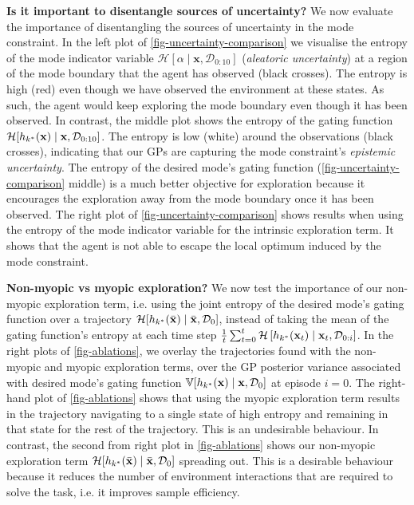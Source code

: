 \documentclass[twoside]{article}
\newcommand{\state}{\ensuremath{\mathbf{x}}}
\newcommand{\dataset}{\ensuremath{\mathcal{D}}}
\newcommand{\modeVar}{\ensuremath{\alpha}}
\newcommand{\gatingFunc}{\ensuremath{h}}
\begin{document}
\textbf{Is it important to disentangle sources of uncertainty?}
We now evaluate the importance of disentangling the sources of uncertainty in the mode constraint.
In the left plot of \cref{fig-uncertainty-comparison} we visualise the entropy of the mode indicator variable \(\mathcal{H}[\modeVar \mid \state, \dataset_{0:10}]\)
(\emph{aleatoric uncertainty}) at a region of the mode boundary that the agent has observed (black crosses).
The entropy is high (red) even though we have observed the environment at these states.
As such, the agent would keep exploring the mode boundary even though it has been observed.
In contrast,  the middle plot shows the entropy of the gating function \(\mathcal{H}[\gatingFunc_{\desiredMode}(\state) \mid \state, \dataset_{0:10}]\).
The entropy is low (white) around the observations (black crosses), indicating that our GPs are capturing the
mode constraint's \emph{epistemic uncertainty}.
The entropy of the desired mode's gating function (\cref{fig-uncertainty-comparison} middle) is a much better
objective for exploration because it encourages the exploration away from the mode boundary once it has been observed.
The right plot of \cref{fig-uncertainty-comparison} shows results when using the entropy of the mode indicator variable
for the intrinsic exploration term.
It shows that the agent is not able to escape the local optimum induced by the mode constraint.


\textbf{Non-myopic vs myopic exploration?}
We now test the importance of our non-myopic exploration term, i.e. using the joint entropy of the desired mode's gating function over a trajectory \(\mathcal{H}[\gatingFunc_{\desiredMode}(\stateTraj) \mid \stateTraj, \dataset_{0}]\),
instead of taking the mean of the gating function's entropy at each time step
\(\frac{1}{\TimeInd}\sum_{\timeInd=0}^{\TimeInd}\mathcal{H} \left[\gatingFunc_{\desiredMode}(\state_{\timeInd}) \mid \state_{\timeInd}, \dataset_{0:i} \right]\).
In the right plots of \cref{fig-ablations}, we overlay the trajectories found with the non-myopic and myopic exploration terms,
over the GP posterior variance associated with
desired mode's gating function \(\mathbb{V}[\gatingFunc_{\desiredMode}(\state) \mid \state, \dataset_{0}]\) at episode \(i=0\).
The right-hand plot of \cref{fig-ablations} shows that using the myopic exploration term results in the trajectory
navigating to a single state of high entropy and remaining in that state for the rest of the trajectory.
This is an undesirable behaviour.
In contrast, the second from right plot in \cref{fig-ablations} shows our non-myopic exploration
term \(\mathcal{H}[\gatingFunc_{\desiredMode}(\stateTraj) \mid \stateTraj, \dataset_{0}]\) spreading out.
This is a desirable behaviour because it reduces the number of environment interactions that are required to solve the task,
i.e. it improves sample efficiency.
\end{document}
